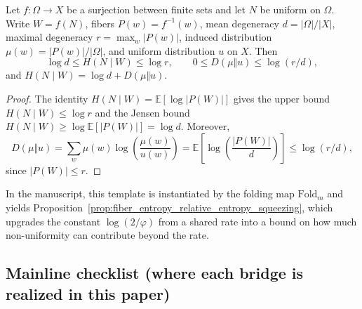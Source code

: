 \begin{lemma}\label{lem:rb_e_fiber_entropy_squeezing_template}
\MathTag Let $f:\Omega\to X$ be a surjection between finite sets and let $N$ be uniform on $\Omega$.
Write $W=f(N)$, fibers $P(w)=f^{-1}(w)$, mean degeneracy $d=|\Omega|/|X|$, maximal degeneracy $r=\max_{w}|P(w)|$, induced distribution $\mu(w)=|P(w)|/|\Omega|$, and uniform distribution $u$ on $X$.
Then
\[
\log d\le H(N\mid W)\le \log r,
\qquad
0\le D(\mu\Vert u)\le \log(r/d),
\]
and $H(N\mid W)=\log d + D(\mu\Vert u)$.
\end{lemma}
\begin{proof}
The identity $H(N\mid W)=\mathbb{E}[\log|P(W)|]$ gives the upper bound $H(N\mid W)\le \log r$ and the Jensen bound $H(N\mid W)\ge \log \mathbb{E}[|P(W)|]=\log d$.
Moreover,
\[
D(\mu\Vert u)=\sum_w \mu(w)\log\!\left(\frac{\mu(w)}{u(w)}\right)
=\mathbb{E}\!\left[\log\!\left(\frac{|P(W)|}{d}\right)\right]
\le \log(r/d),
\]
since $|P(W)|\le r$.
\end{proof}

\AuditTag In the manuscript, this template is instantiated by the folding map $\mathrm{Fold}_m$ and yields Proposition~\ref{prop:fiber_entropy_relative_entropy_squeezing}, which upgrades the constant $\log(2/\varphi)$ from a shared rate into a bound on how much non-uniformity can contribute beyond the rate.

\subsection{Mainline checklist (where each bridge is realized in this paper)}
\label{subsec:rb_mainline_checklist}

